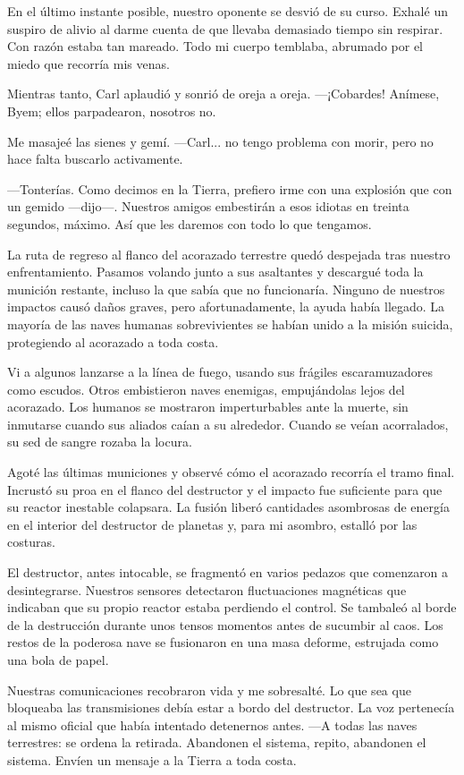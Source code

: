 En el último instante posible, nuestro oponente se desvió de su curso. Exhalé un suspiro de alivio al darme cuenta de que llevaba demasiado tiempo sin respirar. Con razón estaba tan mareado. Todo mi cuerpo temblaba, abrumado por el miedo que recorría mis venas.

Mientras tanto, Carl aplaudió y sonrió de oreja a oreja. —¡Cobardes! Anímese, Byem; ellos parpadearon, nosotros no.

Me masajeé las sienes y gemí. —Carl... no tengo problema con morir, pero no hace falta buscarlo activamente.

—Tonterías. Como decimos en la Tierra, prefiero irme con una explosión que con un gemido —dijo—. Nuestros amigos embestirán a esos idiotas en treinta segundos, máximo. Así que les daremos con todo lo que tengamos.

La ruta de regreso al flanco del acorazado terrestre quedó despejada tras nuestro enfrentamiento. Pasamos volando junto a sus asaltantes y descargué toda la munición restante, incluso la que sabía que no funcionaría. Ninguno de nuestros impactos causó daños graves, pero afortunadamente, la ayuda había llegado. La mayoría de las naves humanas sobrevivientes se habían unido a la misión suicida, protegiendo al acorazado a toda costa.

Vi a algunos lanzarse a la línea de fuego, usando sus frágiles escaramuzadores como escudos. Otros embistieron naves enemigas, empujándolas lejos del acorazado. Los humanos se mostraron imperturbables ante la muerte, sin inmutarse cuando sus aliados caían a su alrededor. Cuando se veían acorralados, su sed de sangre rozaba la locura.

Agoté las últimas municiones y observé cómo el acorazado recorría el tramo final. Incrustó su proa en el flanco del destructor y el impacto fue suficiente para que su reactor inestable colapsara. La fusión liberó cantidades asombrosas de energía en el interior del destructor de planetas y, para mi asombro, estalló por las costuras.

El destructor, antes intocable, se fragmentó en varios pedazos que comenzaron a desintegrarse. Nuestros sensores detectaron fluctuaciones magnéticas que indicaban que su propio reactor estaba perdiendo el control. Se tambaleó al borde de la destrucción durante unos tensos momentos antes de sucumbir al caos. Los restos de la poderosa nave se fusionaron en una masa deforme, estrujada como una bola de papel.

Nuestras comunicaciones recobraron vida y me sobresalté. Lo que sea que bloqueaba las transmisiones debía estar a bordo del destructor. La voz pertenecía al mismo oficial que había intentado detenernos antes. —A todas las naves terrestres: se ordena la retirada. Abandonen el sistema, repito, abandonen el sistema. Envíen un mensaje a la Tierra a toda costa.

